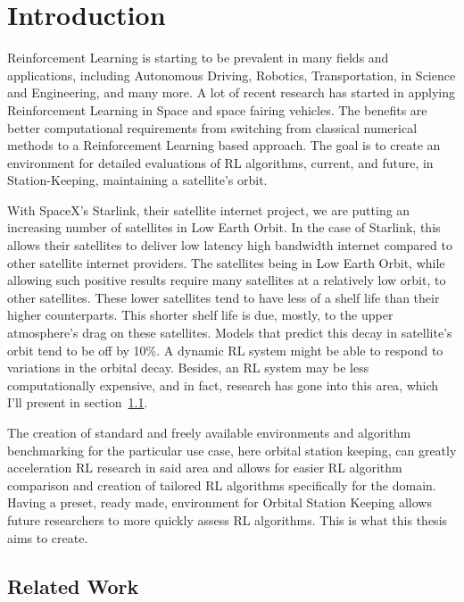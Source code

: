 \chapter{Introduction}\label{ch:intro}

Reinforcement Learning is starting to be prevalent in many fields and applications, including Autonomous Driving, Robotics, Transportation, in Science and Engineering, and many more. A lot of recent research has started in applying Reinforcement Learning in Space and space fairing vehicles. The benefits are better computational requirements from switching from classical numerical methods to a Reinforcement Learning based approach. The goal is to create an environment for detailed evaluations of RL algorithms, current, and future, in Station-Keeping, maintaining a satellite's orbit.

With SpaceX's Starlink, their satellite internet project, we are putting an increasing number of satellites in Low Earth Orbit. In the case of Starlink, this allows their satellites to deliver low latency high bandwidth internet compared to other satellite internet providers. The satellites being in Low Earth Orbit, while allowing such positive results require many satellites at a relatively low orbit, to other satellites. These lower satellites tend to have less of a shelf life than their higher counterparts. This shorter shelf life is due, mostly, to the upper atmosphere's drag on these satellites. Models that predict this decay in satellite's orbit tend to be off by 10\%. A dynamic RL system might be able to respond to variations in the orbital decay. Besides, an RL system may be less computationally expensive, and in fact, research has gone into this area, which I'll present in section~\ref{sec:relatedwork}.

The creation of standard and freely available environments and algorithm benchmarking for the particular use case, here orbital station keeping, can greatly acceleration RL research in said area and allows for easier RL algorithm comparison and creation of tailored RL algorithms specifically for the domain. Having a preset, ready made, environment for Orbital Station Keeping allows future researchers to more quickly assess RL algorithms. This is what this thesis aims to create.

\section{Related Work}\label{sec:relatedwork}

